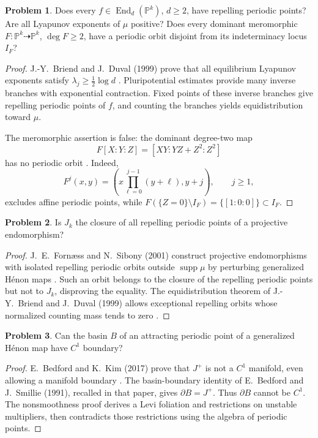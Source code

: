 \documentclass[11pt,reqno]{amsart}
\theoremstyle{definition}
\newtheorem{problem}{Problem}[section]
\theoremstyle{remark}
\begin{document}
\begin{problem}\label{b95-10-3-2}\label{b95-10-3-8}
Does every $f\in\operatorname{End}_d(\mathbb P^k)$, $d\geq2$, have repelling periodic points? Are all Lyapunov exponents of $\mu$ positive? Does every dominant meromorphic $F:\mathbb P^k\dashrightarrow\mathbb P^k$, $\deg F\geq2$, have a periodic orbit disjoint from its indeterminacy locus $I_F$?
\end{problem}
\begin{proof}
J.-Y.~Briend and J.~Duval (1999) prove that all equilibrium Lyapunov exponents satisfy $\lambda_j\geq\tfrac12\log d$ \cite{B95-BD}. Pluripotential estimates provide many inverse branches with exponential contraction. Fixed points of these inverse branches give repelling periodic points of $f$, and counting the branches yields equidistribution toward $\mu$.

The meromorphic assertion is false: the dominant degree-two map
\[
 F[X:Y:Z]=[XY:YZ+Z^2:Z^2]
\]
has no periodic orbit \cite[Example~23]{B95-KS2014}. Indeed,
\[
 F^j(x,y)=\left(x\prod_{\ell=0}^{j-1}(y+\ell),y+j\right),\qquad j\geq1,
\]
excludes affine periodic points, while $F(\{Z=0\}\setminus I_F)=\{[1:0:0]\}\subset I_F$.
\end{proof}

\begin{problem}\label{b95-10-3-3}
Is $J_k$ the closure of all repelling periodic points of a projective endomorphism?
\end{problem}
\begin{proof}
J.~E.~Forn\ae ss and N.~Sibony (2001) construct projective endomorphisms with isolated repelling periodic orbits outside $\operatorname{supp}\mu$ by perturbing generalized H\'enon maps \cite{B95-FSExamples}. Such an orbit belongs to the closure of the repelling periodic points but not to $J_k$, disproving the equality. The equidistribution theorem of J.-Y.~Briend and J.~Duval (1999) allows exceptional repelling orbits whose normalized counting mass tends to zero \cite{B95-BD}.
\end{proof}

\begin{problem}\label{FS-2.3}
Can the basin $B$ of an attracting periodic point of a generalized H\'enon map have $C^1$ boundary?
\end{problem}
\begin{proof}
E.~Bedford and K.~Kim (2017) prove that $J^+$ is not a $C^1$ manifold, even allowing a manifold boundary \cite{FS-BK}. The basin-boundary identity of E.~Bedford and J.~Smillie (1991), recalled in that paper, gives $\partial B=J^+$. Thus $\partial B$ cannot be $C^1$. The nonsmoothness proof derives a Levi foliation and restrictions on unstable multipliers, then contradicts those restrictions using the algebra of periodic points.
\end{proof}
\end{document}
